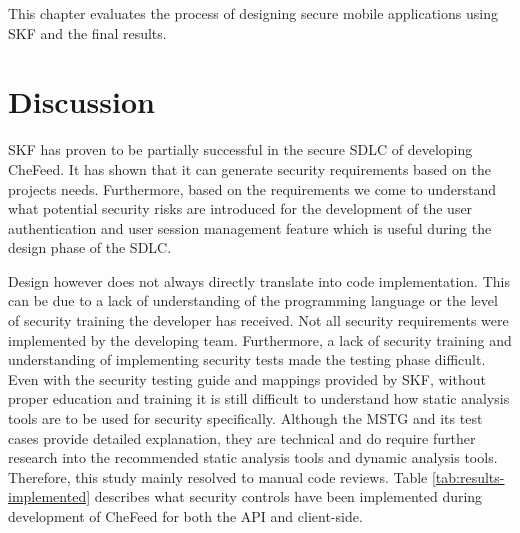This chapter evaluates the process of designing secure mobile applications using SKF and the final results.

\section{Discussion}
SKF has proven to be partially successful in the secure SDLC of developing CheFeed. It has shown that it can generate security requirements based on the projects needs. Furthermore, based on the requirements we come to understand what potential security risks are introduced for the development of the user authentication and user session management feature which is useful during the design phase of the SDLC. 

Design however does not always directly translate into code implementation. This can be due to a lack of understanding of the programming language or the level of security training the developer has received. Not all security requirements were implemented by the developing team. Furthermore, a lack of security training and understanding of implementing security tests made the testing phase difficult. Even with the security testing guide and mappings provided by SKF, without proper education and training it is still difficult to understand how static analysis tools are to be used for security specifically. Although the MSTG and its test cases provide detailed explanation, they are technical and do require further research into the recommended static analysis tools and dynamic analysis tools. Therefore, this study mainly resolved to manual code reviews. Table \ref{tab:results-implemented} describes what security controls have been implemented during development of CheFeed for both the API and client-side.

